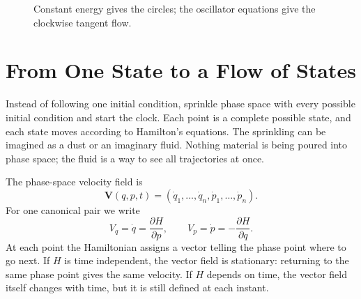\begin{figure}[htbp]
  \centering
  \caption{Constant energy gives the circles; the oscillator equations give
  the clockwise tangent flow.}
\end{figure}

\begin{classroomqa}
\end{classroomqa}

\section{From One State to a Flow of States}

Instead of following one initial condition, sprinkle phase space with every
possible initial condition and start the clock.  Each point is a complete
possible state, and each state moves according to Hamilton's equations.  The
sprinkling can be imagined as a dust or an imaginary fluid.  Nothing material
is being poured into phase space; the fluid is a way to see all trajectories
at once.

The phase-space velocity field is
\begin{equation}
  \mathbf V(q,p,t)
  =
  (\dot q_1,\ldots,\dot q_n,\dot p_1,\ldots,\dot p_n).
  \label{eq:l7-phase-velocity}
\end{equation}
For one canonical pair we write
\begin{equation}
  V_q=\dot q=\frac{\partial H}{\partial p},
  \qquad
  V_p=\dot p=-\frac{\partial H}{\partial q}.
  \label{eq:l7-phase-components}
\end{equation}
At each point the Hamiltonian assigns a vector telling the phase point where
to go next.  If \(H\) is time independent, the vector field is stationary:
returning to the same phase point gives the same velocity.  If \(H\) depends
on time, the vector field itself changes with time, but it is still defined at
each instant.

